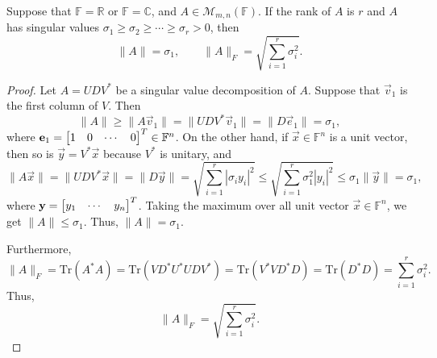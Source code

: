 \documentclass{homework}
\begin{document}
	\question Suppose that $\mathbb{F} = \mathbb{R}$ or $\mathbb{F} = \mathbb{C}$, and $A \in \mathcal{M}_{m,n}(\mathbb{F})$. If the rank of $A$ is $r$ and $A$ has singular values $\sigma_1 \ge \sigma_2 \ge \cdots \ge \sigma_r > 0$, then
	\begin{equation*}
		\lVert A\rVert = \sigma_1, \qquad \lVert A \rVert_F = \sqrt{\sum_{i=1}^r\sigma_i^2}.
	\end{equation*}
	\begin{proof}
		Let $A= UDV^*$ be a singular value decomposition of $A$. Suppose that $\vec{v}_1$ is the first column of $V$. Then
		\begin{equation*}
			\lVert A \rVert \ge \lVert A\vec{v}_1\rVert = \lVert U D V^*\vec{v}_1\rVert = \lVert D \vec{e}_1\rVert = \sigma_1,
		\end{equation*}
		where $\mathbf{e}_1 = \left[\begin{matrix}1 & 0 & \cdots & 0\end{matrix}\right]^T \in \mathbb{F}^n$. On the other hand, if $\vec{x} \in \mathbb{F}^n$ is a unit vector, then so is $\vec{y} = V^*\vec{x}$ because $V^*$ is unitary, and
		\begin{equation*}
			\lVert A \vec{x} \rVert = \lVert UDV^*\vec{x}\rVert = \lVert D\vec{y}\rVert = \sqrt{\sum_{i=1}^r|\sigma_iy_i|^2} \le \sqrt{\sum_{i=1}^r\sigma_1^2|y_i|^2} \le \sigma_1\lVert \vec{y}\rVert = \sigma_1,
		\end{equation*}
		where $\mathbf{y} = \left[\begin{matrix}y_1 & \cdots & y_n\end{matrix}\right]^T$. Taking the maximum over all unit vector $\vec{x} \in \mathbb{F}^n$, we get $\lVert A\rVert \le \sigma_1$. Thus, $\lVert A \rVert = \sigma_1$.
		
		Furthermore,
		\begin{equation*}
			\lVert A \rVert_F = \mathrm{Tr}(A^*A) = \mathrm{Tr}(VD^*U^*UDV^*) = \mathrm{Tr}(V^*VD^*D) = \mathrm{Tr}(D^*D) = \sum_{i=1}^r \sigma_i^2.
		\end{equation*}
		Thus,
		\begin{equation*}
			\lVert A \rVert_F = \sqrt{\sum_{i=1}^r\sigma_i^2}.
		\end{equation*}
	\end{proof}
	
\end{document}
